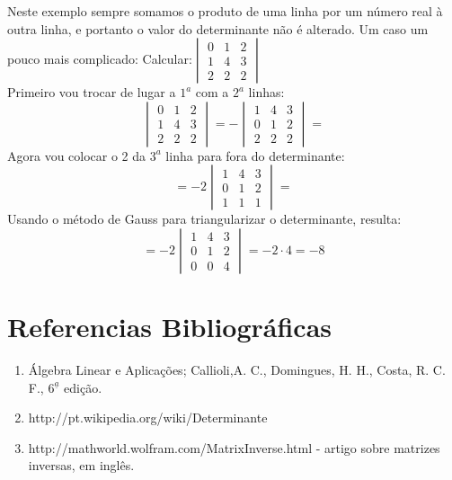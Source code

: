 Neste exemplo sempre somamos o produto de uma linha por um número real à outra linha, e portanto
o valor do determinante não é alterado. Um caso um pouco mais complicado:
Calcular:$ \begin{vmatrix} 0 & 1 & 2 \\ 1 & 4 & 3 \\ 2 & 2 & 2 \end{vmatrix}$\\
Primeiro vou trocar de lugar a $1^a$ com a $2^a$ linhas:
\[\begin{vmatrix} 0 & 1 & 2 \\ 1 & 4 & 3 \\ 2 & 2 & 2 \end{vmatrix} =- \begin{vmatrix}  1 & 4 & 3\\0 & 1 & 2  \\ 2 & 2 & 2 \end{vmatrix}=\]
Agora vou colocar o 2 da $3^a$ linha para fora do determinante:
\[=-2 \begin{vmatrix}  1 & 4 & 3\\0 & 1 & 2  \\ 1 & 1 & 1 \end{vmatrix}= \]
Usando o método de Gauss para triangularizar o determinante, resulta:
\[=-2 \begin{vmatrix}  1 & 4 & 3\\0 & 1 & 2  \\ 0 & 0 & 4 \end{vmatrix}= -2 \cdot 4 = -8\]

   \newpage
   
\section{Referencias Bibliográficas}
\begin{enumerate}
  \item Álgebra Linear e Aplicações; Callioli,A. C., Domingues, H. H., Costa, R. C. F., $6^{\underline{a}}$ edição.
  \item http://pt.wikipedia.org/wiki/Determinante
  \item http://mathworld.wolfram.com/MatrixInverse.html - artigo sobre matrizes inversas, em inglês.
\end{enumerate}
